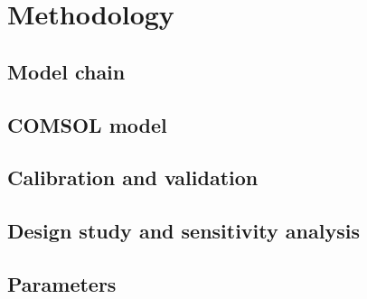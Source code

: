 
\chapter{Methodology}

\section{Model chain}

\section{COMSOL model}

\section{Calibration and validation}

\section{Design study and sensitivity analysis}

\section{Parameters}
